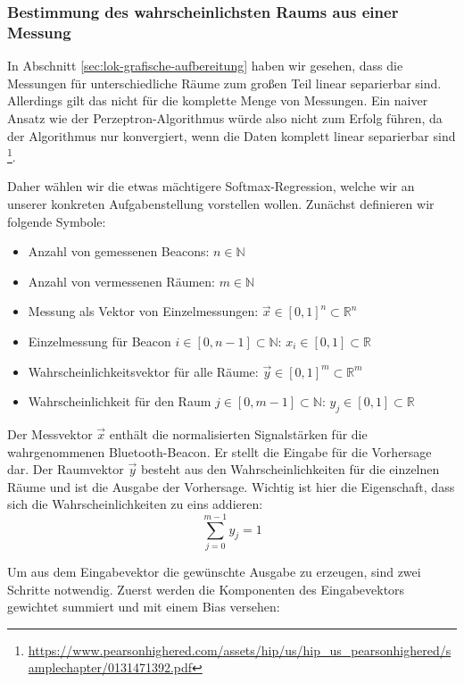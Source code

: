 \subsubsection{Bestimmung des wahrscheinlichsten Raums aus einer Messung}
\label{sec:lok-wahrscheinlich}

In Abschnitt \ref{sec:lok-grafische-aufbereitung} haben wir gesehen, dass die
Messungen für unterschiedliche Räume zum großen Teil linear separierbar sind.
Allerdings gilt das nicht für die komplette Menge von Messungen.
Ein naiver Ansatz wie der Perzeptron-Algorithmus würde also nicht zum Erfolg
führen, da der Algorithmus nur konvergiert, wenn die Daten komplett linear
separierbar sind
\footnote{\url{https://www.pearsonhighered.com/assets/hip/us/hip_us_pearsonhighered/samplechapter/0131471392.pdf}}.

Daher wählen wir die etwas mächtigere Softmax-Regression, welche wir an unserer
konkreten Aufgabenstellung vorstellen wollen.
Zunächst definieren wir folgende Symbole:
\begin{itemize}
	\item Anzahl von gemessenen Beacons: $n \in \mathbb{N}$
	\item Anzahl von vermessenen Räumen: $m \in \mathbb{N}$
	\item Messung als Vektor von Einzelmessungen: $ \vec{x} \in [0, 1]^n \subset \mathbb{R}^n $
	\item Einzelmessung für Beacon $i \in [0, n - 1] \subset \mathbb{N}$: $x_i \in [0, 1] \subset \mathbb{R}$
	\item Wahrscheinlichkeitsvektor für alle Räume: $ \vec{y} \in [0, 1]^m \subset \mathbb{R}^m$
	\item Wahrscheinlichkeit für den Raum $j \in [0, m - 1] \subset \mathbb{N}$:
		$ y_j \in [0, 1] \subset \mathbb{R} $ 
\end{itemize}

Der Messvektor $\vec{x}$ enthält die normalisierten Signalstärken für die wahrgenommenen
Bluetooth-Beacon. Er stellt die Eingabe für die Vorhersage dar. 
Der Raumvektor $\vec{y}$ besteht aus den Wahrscheinlichkeiten für die einzelnen Räume und
ist die Ausgabe der Vorhersage. Wichtig ist hier die Eigenschaft, dass sich die Wahrscheinlichkeiten
zu eins addieren:
$$ \sum_{j=0}^{m-1} y_j = 1 $$

Um aus dem Eingabevektor die gewünschte Ausgabe zu erzeugen, sind zwei Schritte notwendig.
Zuerst werden die Komponenten des Eingabevektors gewichtet summiert und mit einem Bias
versehen:

